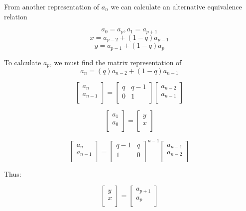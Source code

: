 \documentclass[paper.tex]{subfiles}
\begin{document}
From another representation of $a_{n}$ we can calculate an alternative equivalence relation

$$a_{0} = a_{p}, a_{1} = a_{p+1}$$
$$x = a_{p-2} + (1-q)a_{p-1}$$
$$ y = a_{p-1} + (1-q)a_{p}$$

To calculate $a_{p}$, we must find the matrix representation of 
$$ a_{n} = (q)a_{n-2} + (1-q)a_{n-1} $$



\[ 
\left[ \begin{array}{ccc}
a_{n} \\
a_{n-1} \\
\end{array} \right] 
=
\left[ \begin{array}{ccc}
q & q-1 \\
0 & 1 \\
\end{array} \right]
\left[ \begin{array}{ccc}
 a_{n-2}\\
a_{n-1} \\
\end{array} \right]
\] 

\[ 
\left[ \begin{array}{ccc}
a_{1} \\
a_{0} \\
\end{array} \right] 
=
\left[ \begin{array}{ccc}
y \\
x \\
\end{array} \right]
\] 

\[ 
\left[ \begin{array}{ccc}
a_{n} \\
a_{n-1} \\
\end{array} \right] 
=
\left[ \begin{array}{ccc}
q-1 & q \\
1 & 0 \\
\end{array} \right] ^{n-1}
\left[ \begin{array}{ccc}
 a_{n-1}\\
a_{n-2} \\
\end{array} \right]
\] 

Thus:

\[ 
\left[ \begin{array}{ccc}
y \\
x \\
\end{array} \right] 
=
\left[ \begin{array}{ccc}
a_{p+1} \\
a_{p} \\
\end{array} \right]
\] 
\end{document}
